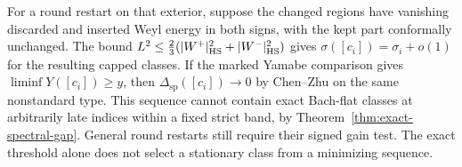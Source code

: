 For a round restart on that exterior, suppose the changed
regions have vanishing discarded and inserted Weyl energy in
both signs, with the kept part conformally unchanged. The bound
\(L^2\le\tfrac23(|W^+|_{\rm HS}^2+|W^-|_{\rm HS}^2)\) gives
\(\sigma([c_i])=\sigma_i+o(1)\) for the resulting capped classes.
If the marked Yamabe comparison gives \(\liminf Y([c_i])\ge y\),
then \(\Delta_{\mathrm{sp}}([c_i])\to0\) by Chen--Zhu on the same
nonstandard type. This sequence cannot contain exact Bach-flat
classes at arbitrarily late indices within a fixed strict band,
by Theorem~\ref{thm:exact-spectral-gap}. General round restarts
still require their signed gain test. The exact threshold alone
does not select a stationary class from a minimizing sequence.
